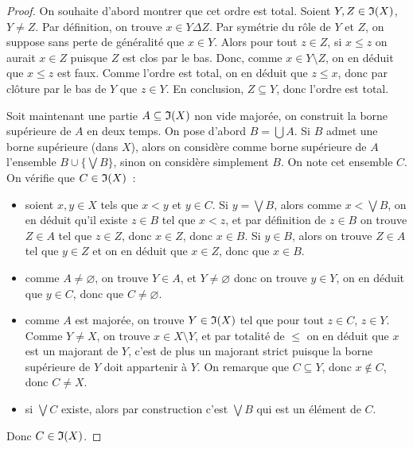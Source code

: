 \begin{proof}
  On souhaite d'abord montrer que cet ordre est total. Soient $Y,Z\in\mathfrak{I}(X)$,
  $Y\neq Z$. Par définition, on trouve $x\in Y\Delta Z$. Par symétrie du rôle de
  $Y$ et $Z$, on suppose sans perte de généralité que $x\in Y$. Alors pour tout
  $z\in Z$, si $x \leq z$ on aurait $x\in Z$ puisque $Z$ est clos par le bas.
  Donc, comme $x\in Y\setminus Z$, on en déduit que $x \leq z$ est faux. Comme
  l'ordre est total, on en déduit que $z\leq x$, donc par clôture par le bas de
  $Y$ que $z\in Y$. En conclusion, $Z\subseteq Y$, donc l'ordre est total.

  Soit maintenant une partie $A\subseteq \mathfrak{I}(X)$ non vide majorée, on
  construit la borne supérieure de $A$ en deux temps. On pose d'abord
  $B = \bigcup A$. Si $B$ admet une borne supérieure (dans $X$), alors on
  considère comme borne supérieure de $A$ l'ensemble $B \cup\{\bigvee B\}$,
  sinon on considère simplement $B$. On note cet ensemble $C$. On vérifie que
  $C\in \mathfrak{I}(X)$~:
  \begin{itemize}
  \item soient $x,y\in X$ tels que $x < y$ et $y\in C$. Si $y = \bigvee B$,
    alors comme $x < \bigvee B$, on en déduit qu'il existe $z \in B$ tel que
    $x < z$, et par définition de $z\in B$ on trouve $Z\in A$ tel que $z\in Z$,
    donc $x \in Z$, donc $x \in B$. Si $y \in B$, alors on trouve $Z\in A$ tel
    que $y \in Z$ et on en déduit que $x\in Z$, donc que $x \in B$.
  \item comme $A\neq \varnothing$, on trouve $Y\in A$, et $Y\neq\varnothing$
    donc on trouve $y\in Y$, on en déduit que $y\in C$, donc que
    $C\neq\varnothing$.
  \item comme $A$ est majorée, on trouve $Y \in \mathfrak{I}(X)$ tel que pour tout
    $z\in C$, $z\in Y$. Comme $Y\neq X$, on trouve $x\in X\setminus Y$,
    et par totalité de $\leq$ on en déduit que $x$ est un majorant de $Y$, c'est
    de plus un majorant strict puisque la borne supérieure de $Y$ doit
    appartenir à $Y$. On remarque que $C\subseteq Y$, donc $x\notin C$, donc
    $C\neq X$.
  \item si $\bigvee C$ existe, alors par construction c'est $\bigvee B$ qui est
    un élément de $C$.
  \end{itemize}
  Donc $C\in\mathfrak{I}(X)$.


\end{proof}
